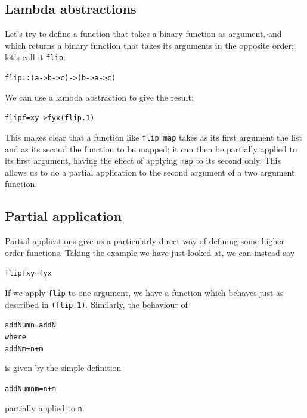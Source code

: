 \subsection*{Lambda abstractions}

Let's try to define a function that takes a binary function as argument, and which returns a binary function that takes its arguments in the opposite order; let's call it \texttt{flip}:
\begin{alltt}
flip :: (a -> b -> c) -> (b -> a -> c)
\end{alltt}
We can use a lambda abstraction to give the result:
\begin{alltt}
flip f = \bs{}x y -> f y x\hfill(flip.1)
\end{alltt}
This makes clear that a function like
\texttt{flip map} takes as its first argument the list and as its second
the function to be mapped; it can then be partially applied to its first argument, having
the effect of applying \texttt{map} to its second only. This allows us to do a partial application to the second argument of a two argument function.

\subsection*{Partial application}

Partial applications give us a particularly direct way of defining some higher order functions. Taking the example we have just looked at, we can instead say
\begin{alltt}
flip f x y = f y x
\end{alltt}
If we apply \texttt{flip} to one argument, we have a function which behaves just as described in \texttt{(flip.1)}. Similarly, the behaviour of 
\begin{alltt}
addNum n = addN
		   where
		   addN m = n+m
\end{alltt}
is given by the simple definition
\begin{alltt}
addNum n m = n+m
\end{alltt}
partially applied to \texttt{n}.


